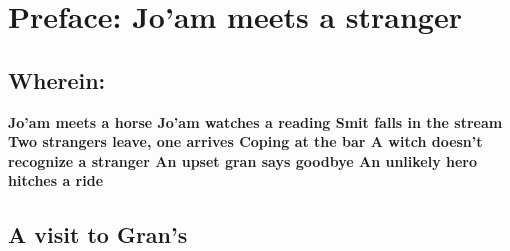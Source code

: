 \section{Preface: Jo'am meets a stranger}\label{sec:joamMeetsAStranger}
\subsection*{Wherein:}
\textbf{%
Jo'am meets a horse \quad\textbullet\quad%
Jo'am watches a reading \quad\textbullet\quad%
Smit falls in the stream \quad\textbullet\quad%
Two strangers leave, one arrives \quad\textbullet\quad%
Coping at the bar \quad\textbullet\quad%
A witch doesn't recognize a stranger \quad\textbullet\quad%
An upset gran says goodbye \quad\textbullet\quad%
An unlikely hero hitches a ride%
}

\noindent\hrulefill

\subsection{A visit to Gran's}

